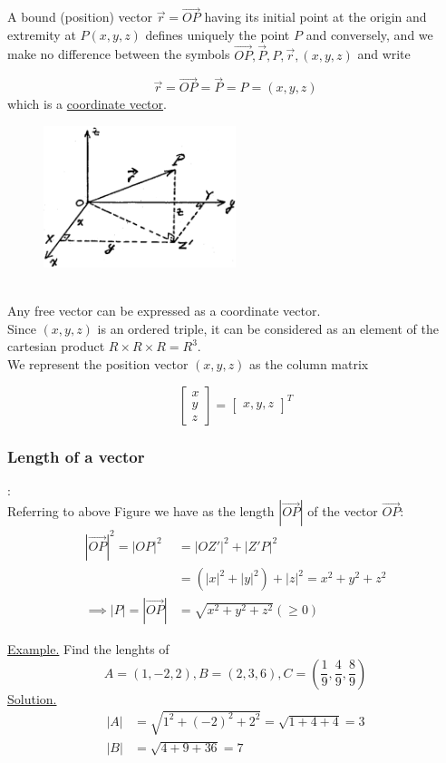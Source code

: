 \documentclass[11pt]{amsbook}
\begin{document}

A bound (position) vector $\vec{r} = \vec{OP}$ having its initial point at the origin and extremity at $P(x, y, z)$ defines uniquely the point $P$ and conversely, and we make no difference between the symbols $\vec{OP}, \vec{P}, P, \vec{r}, (x, y, z)$ and write

\[
	\vec{r} = \vec{OP} = \vec{P} = P = (x, y, z)
\]
which is a \underline{coordinate vector}.
\begin{figure}[htb]
	\centering
	\includegraphics[width=0.5\textwidth]{images/b2p1-121-fig01}
\end{figure}
\\
Any free vector can be expressed as a coordinate vector.
\\
Since $(x, y, z)$ is an ordered triple, it can be considered as an element of the cartesian product $R \times R \times R = R^3$.
\\
We represent the position vector $(x, y, z)$ as the column matrix

\[
	\begin{bmatrix}
		x\\
		y\\
		z
	\end{bmatrix}
	=
	\begin{bmatrix}
		x, y, z
	\end{bmatrix}^{T}
\]
\subsubsection{Length of a vector}:
\label{subsubsec:Lengthofavector}
\\
Referring to above Figure we have as the length $|\vec{OP}|$ of the vector $\vec{OP}$:
\begin{align*}	
	|\vec{OP}|^2 = |OP|^2 &= |OZ'|^2 + |Z'P|^2
	\\
	&= (|x|^2 + |y|^2) + |z|^2 = x^2 + y^2 + z^2
	\\
	\implies
	|P| = |\vec{OP}| &= \sqrt{x^2 + y^2 + z^2} (\geq 0)
\end{align*}

\underline{Example.} Find the lenghts of
\[
	A = (1, -2, 2), B = (2, 3, 6), C = (\frac{1}{9}, \frac{4}{9}, \frac{8}{9})
\]
\underline{Solution.}
\begin{align*}	
	|A| &= \sqrt{1^2 + (-2)^2 + 2^2} = \sqrt{1 + 4 + 4} = 3
	\\
	|B| &= \sqrt{4 + 9 + 36} = 7
\end{align*}

\end{document}
